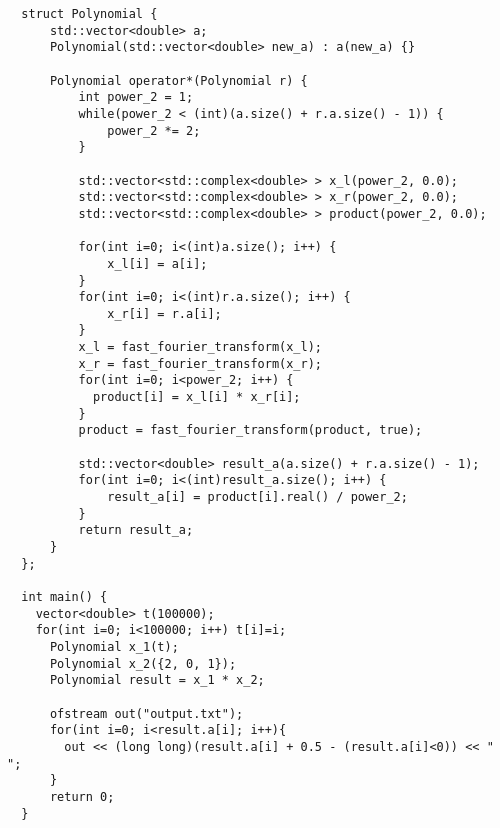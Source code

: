 \begin{lstlisting}
  struct Polynomial {
      std::vector<double> a;
      Polynomial(std::vector<double> new_a) : a(new_a) {}

      Polynomial operator*(Polynomial r) {
          int power_2 = 1;
          while(power_2 < (int)(a.size() + r.a.size() - 1)) {
              power_2 *= 2;
          }

          std::vector<std::complex<double> > x_l(power_2, 0.0);
          std::vector<std::complex<double> > x_r(power_2, 0.0);
          std::vector<std::complex<double> > product(power_2, 0.0);

          for(int i=0; i<(int)a.size(); i++) {
              x_l[i] = a[i];
          }
          for(int i=0; i<(int)r.a.size(); i++) {
              x_r[i] = r.a[i];
          }
          x_l = fast_fourier_transform(x_l);
          x_r = fast_fourier_transform(x_r);
          for(int i=0; i<power_2; i++) {
            product[i] = x_l[i] * x_r[i];
          }
          product = fast_fourier_transform(product, true);

          std::vector<double> result_a(a.size() + r.a.size() - 1);
          for(int i=0; i<(int)result_a.size(); i++) {
              result_a[i] = product[i].real() / power_2;
          }
          return result_a;
      }
  };

  int main() {
    vector<double> t(100000);
    for(int i=0; i<100000; i++) t[i]=i;
      Polynomial x_1(t);
      Polynomial x_2({2, 0, 1});
      Polynomial result = x_1 * x_2;

      ofstream out("output.txt");
      for(int i=0; i<result.a[i]; i++){
        out << (long long)(result.a[i] + 0.5 - (result.a[i]<0)) << " ";
      }
      return 0;
  }
\end{lstlisting}

